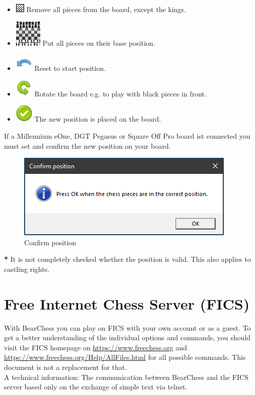 \documentclass[11pt,a4paper]{article}
\begin{document}
\begin{itemize}
	\item \includegraphics[scale=1]{Board64black.png} Remove all pieces from the board, except the kings.
	\item \includegraphics[scale=0.3]{Array.png} Put all pieces on their base position.
	\item \includegraphics[scale=0.5]{Undo.png} Reset to start position.
	\item \includegraphics[scale=0.5]{arrow_rotate_anticlockwise.png} Rotate the board e.g. to play with black pieces in front.
	\item \includegraphics[scale=0.5]{accept_button.png} The new position is placed on the board.
\end{itemize}


If a Millennium eOne, DGT Pegasus or Square Off Pro board ist connected you must set and confirm the new position on your board.
\begin{figure}[H]
	\centering
	\includegraphics[scale=1.0]{ConfirmPosition.png}
	\caption{Confirm position}
	\label{fig:ConfirmPosition}
\end{figure}

\textbf{{\color{red}*}} It is not completely checked whether the position is valid. This also applies to castling rights.

\section{Free Internet Chess Server (FICS)}  \label{FICS}
With BearChess you can play on FICS with your own account or as a guest. To get a better understanding of the individual options and commands, you should visit the FICS homepage on \url{https://www.freechess.org} and \url{https://www.freechess.org/Help/AllFiles.html} for all possible commands. This document is not a replacement for that.\\
A technical information: The communication between BearChess and the FICS server based only on the exchange of simple text via telnet. 
\end{document}
